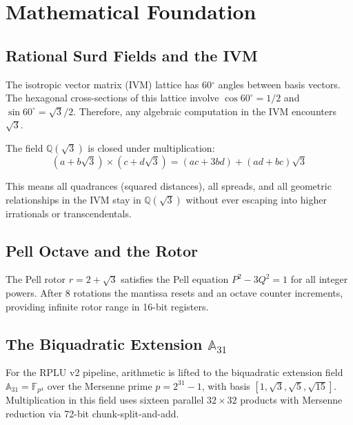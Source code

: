 \documentclass[10pt,twocolumn]{article}
\begin{document}
\section{Mathematical Foundation}
\label{sec:math}

\subsection{Rational Surd Fields and the IVM}
\label{sec:ivm}

The isotropic vector matrix (IVM) lattice has 60$^\circ$ angles between basis
vectors.\cite{fuller1975} The hexagonal cross-sections of this lattice involve
$\cos 60^\circ = 1/2$ and $\sin 60^\circ = \sqrt{3}/2$. Therefore, any
algebraic computation in the IVM encounters $\sqrt{3}$.

The field $\mathbb{Q}(\sqrt{3})$ is closed under multiplication:
\begin{equation}
(a+b\sqrt{3}) \times (c+d\sqrt{3}) = (ac+3bd) + (ad+bc)\sqrt{3}
\end{equation}

This means all quadrances (squared distances), all spreads, and all geometric
relationships in the IVM stay in $\mathbb{Q}(\sqrt{3})$ without ever escaping
into higher irrationals or transcendentals.\cite{wildberger2005}

\subsection{Pell Octave and the Rotor}
\label{sec:pell}

The Pell rotor $r = 2 + \sqrt{3}$ satisfies the Pell equation
$P^2 - 3Q^2 = 1$ for all integer powers. After 8 rotations the mantissa
resets and an octave counter increments, providing infinite rotor range in
16-bit registers.\cite{thomson2026}

\subsection{The Biquadratic Extension \texorpdfstring{$\mathbb{A}_{31}$}{A31}}
\label{sec:a31}

For the RPLU v2 pipeline, arithmetic is lifted to the biquadratic extension
field $\mathbb{A}_{31} = \mathbb{F}_{p^4}$ over the Mersenne prime
$p = 2^{31}-1$, with basis $[1, \sqrt{3}, \sqrt{5}, \sqrt{15}]$.
Multiplication in this field uses sixteen parallel $32\times32$ products
with Mersenne reduction via 72-bit chunk-split-and-add.
\end{document}
